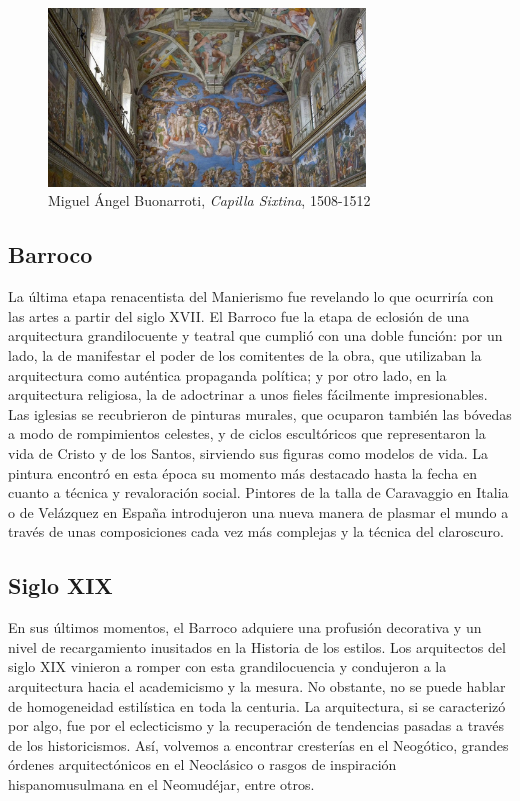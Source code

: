 \begin{figure}[!h]
    \begin{center}
        \includegraphics[width=0.75\textwidth]{imagenes/2/capilla-sixtina.jpg}
        \caption{Miguel Ángel Buonarroti, \textit{Capilla Sixtina}, 1508-1512}
        \label{fig:capilla-sixtina}
    \end{center}
\end{figure}

\subsection{Barroco}

La última etapa renacentista del Manierismo fue revelando lo que ocurriría con las artes a partir del siglo XVII. El Barroco fue la etapa de eclosión de una arquitectura grandilocuente y teatral que cumplió con una doble función: por un lado, la de manifestar el poder de los comitentes de la obra, que utilizaban la arquitectura como auténtica propaganda política; y por otro lado, en la arquitectura religiosa, la de adoctrinar a unos fieles fácilmente impresionables. Las iglesias se recubrieron de pinturas murales, que ocuparon también las bóvedas a modo de rompimientos celestes, y de ciclos escultóricos que representaron la vida de Cristo y de los Santos, sirviendo sus figuras como modelos de vida. La pintura encontró en esta época su momento más destacado hasta la fecha en cuanto a técnica y revaloración social. Pintores de la talla de Caravaggio en Italia o de Velázquez en España introdujeron una nueva manera de plasmar el mundo a través de unas composiciones cada vez más complejas y la técnica del claroscuro.

\subsection{Siglo XIX}

En sus últimos momentos, el Barroco adquiere una profusión decorativa y un nivel de recargamiento inusitados en la Historia de los estilos. Los arquitectos del siglo XIX vinieron a romper con esta grandilocuencia y condujeron a la arquitectura hacia el academicismo y la mesura. No obstante, no se puede hablar de homogeneidad estilística en toda la centuria. La arquitectura, si se caracterizó por algo, fue por el eclecticismo y la recuperación de tendencias pasadas a través de los historicismos. Así, volvemos a encontrar cresterías en el Neogótico, grandes órdenes arquitectónicos en el Neoclásico o rasgos de inspiración hispanomusulmana en el Neomudéjar, entre otros.

